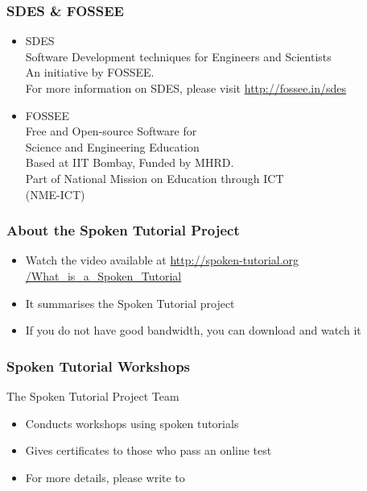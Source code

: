 \documentclass[17pt,compress]{beamer}
\begin{document}
\begin{frame}
\frametitle{SDES \& FOSSEE}
\begin{center}
\begin{itemize}
\item \small{SDES}\\
\small{\color{LimeGreen}Software Development techniques for Engineers and Scientists} \\
\scriptsize An initiative by FOSSEE. \\
\vspace{3pt}
\scriptsize For more information on SDES, please visit {\color{blue}\url{http://fossee.in/sdes}}\\
\vspace{10pt}
\item \small{FOSSEE}\\
\small {\color{LimeGreen}Free and Open-source Software for \\Science and Engineering Education} \\
\scriptsize Based at IIT Bombay, Funded by MHRD.\\
\vspace{3pt}
\scriptsize Part of National Mission on Education through ICT \\(NME-ICT) \\
\end{itemize}
\end{center}
\end{frame}

\begin{frame}
\frametitle{About the Spoken Tutorial Project}
\begin{itemize}
\item Watch the video available at {\color{blue}\url{http://spoken-tutorial.org /What\_is\_a\_Spoken\_Tutorial}} 
\item It summarises the Spoken Tutorial project 
\item If you do not have good bandwidth, you can download and watch it
\end{itemize}
\end{frame}

\begin{frame}
\frametitle{Spoken Tutorial Workshops}The Spoken Tutorial Project Team 
\begin{itemize}
\item Conducts workshops using spoken tutorials 
\item Gives certificates to those who pass an online test 
\item For more details, please write to \\ 
\end{itemize}
\end{frame}
\end{document}
